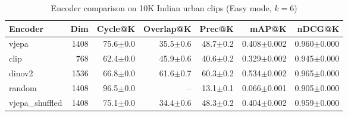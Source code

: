\begin{table}[ht]
\centering
\caption{Encoder comparison on 10K Indian urban clips (Easy mode, $k=6$)}
\label{tab:encoder_comparison}
\begin{tabular}{lrrrrrr}
\toprule
Encoder & Dim & Cycle@K & Overlap@K & Prec@K & mAP@K & nDCG@K \\
\midrule
vjepa & 1408 & 75.6{\tiny$\pm$0.0} & 35.5{\tiny$\pm$0.6} & 48.7{\tiny$\pm$0.2} & 0.408{\tiny$\pm$0.002} & 0.960{\tiny$\pm$0.000} \\
clip & 768 & 62.4{\tiny$\pm$0.0} & 45.9{\tiny$\pm$0.6} & 40.6{\tiny$\pm$0.2} & 0.329{\tiny$\pm$0.002} & 0.945{\tiny$\pm$0.000} \\
dinov2 & 1536 & 66.8{\tiny$\pm$0.0} & 61.6{\tiny$\pm$0.7} & 60.3{\tiny$\pm$0.2} & 0.534{\tiny$\pm$0.002} & 0.965{\tiny$\pm$0.000} \\
random & 1408 & 96.5{\tiny$\pm$0.0} & -- & 13.1{\tiny$\pm$0.1} & 0.066{\tiny$\pm$0.001} & 0.905{\tiny$\pm$0.000} \\
vjepa\_shuffled & 1408 & 75.1{\tiny$\pm$0.0} & 34.4{\tiny$\pm$0.6} & 48.3{\tiny$\pm$0.2} & 0.404{\tiny$\pm$0.002} & 0.959{\tiny$\pm$0.000} \\
\bottomrule
\end{tabular}
\end{table}